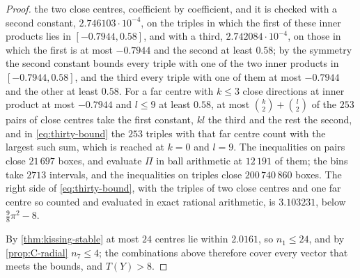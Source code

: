 \documentclass[11pt,reqno]{amsart}
\renewcommand{\_}{\origunderscore\allowbreak}
\numberwithin{equation}{section}
\theoremstyle{plain}
\theoremstyle{definition}
\theoremstyle{remark}
\begin{document}
\begin{proof}
the two close centres, coefficient by coefficient, and it is checked with a
second constant, $2.746103\cdot10^{-4}$, on the triples in which the first of these
inner products lies in $[-0.7944,0.58]$, and with a third, $2.742084\cdot10^{-4}$, on
those in which the first is at most $-0.7944$ and the second at least
$0.58$; by the symmetry the second constant bounds every triple with one
of the two inner products in $[-0.7944,0.58]$, and the third every triple
with one of them at most $-0.7944$ and the other at least $0.58$. For a
far centre with $k\le3$ close directions at inner product at most $-0.7944$
and $l\le9$ at least $0.58$, at most $\binom k2+\binom l2$ of the $253$
pairs of close centres take the first constant, $kl$ the third and the rest
the second, and in \eqref{eq:thirty-bound} the $253$ triples with that far
centre count with the largest such sum, which is reached at $k=0$ and
$l=9$. The inequalities on pairs close $21\,697$ boxes, and evaluate $\Pi$ in
ball arithmetic at $12\,191$ of them; the bins take $2713$ intervals, and the
inequalities on triples close $200\,740\,860$ boxes. The right side of
\eqref{eq:thirty-bound}, with the triples of two close centres and one far
centre so counted and evaluated in exact rational arithmetic, is
$3.103231$, below $\frac98\pi^2-8$.

By \cref{thm:kissing-stable} at most $24$ centres lie within $2.0161$, so
$n_1\le24$, and by \cref{prop:C-radial} $n_7\le4$; the combinations above
therefore cover every vector that meets the bounds, and $T(Y)>8$.
\end{proof}
\end{document}
